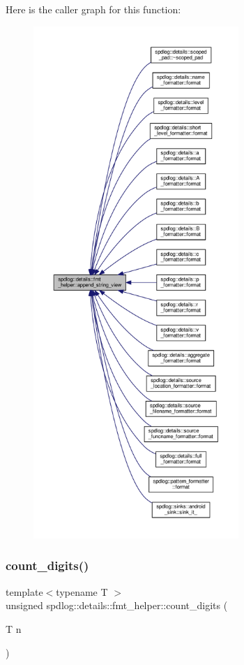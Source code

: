 Here is the caller graph for this function\+:
\nopagebreak
\begin{figure}[H]
\begin{center}
\leavevmode
\includegraphics[height=550pt]{namespacespdlog_1_1details_1_1fmt__helper_a603f4d0d8853a61610a0042d5d62fe94_icgraph}
\end{center}
\end{figure}
\mbox{\label{namespacespdlog_1_1details_1_1fmt__helper_a976eeb3c4a42ccfb05437aa9a0d4d9f7}} 
\subsubsection{\texorpdfstring{count\+\_\+digits()}{count\_digits()}}
{\footnotesize\ttfamily template$<$typename T $>$ \\
unsigned spdlog\+::details\+::fmt\+\_\+helper\+::count\+\_\+digits (\begin{DoxyParamCaption}\item[{T}]{n }\end{DoxyParamCaption})\hspace{0.3cm}{\ttfamily [inline]}}



